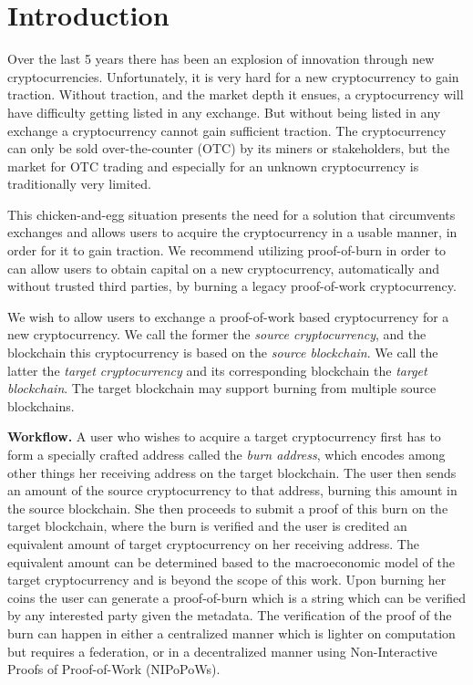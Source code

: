 \section{Introduction}\label{section:introduction}

Over the last 5 years there has been an explosion of innovation through new cryptocurrencies. Unfortunately, it is very hard for a new cryptocurrency to gain traction. Without traction, and the market depth it ensues, a cryptocurrency will have difficulty getting listed in any exchange. But without being listed in any exchange a cryptocurrency cannot gain sufficient traction. The cryptocurrency can only be sold over-the-counter (OTC) by its miners or stakeholders, but the market for OTC trading and especially for an unknown cryptocurrency is traditionally very limited.

This chicken-and-egg situation presents the need for a solution that circumvents exchanges and allows users to acquire the cryptocurrency in a usable manner, in order for it to gain traction. We recommend utilizing proof-of-burn in order to can allow users to obtain capital on a new cryptocurrency, automatically and without trusted third parties, by burning a legacy proof-of-work cryptocurrency.

We wish to allow users to exchange a proof-of-work based cryptocurrency for a new cryptocurrency. We call the former the \emph{source cryptocurrency}, and the blockchain this cryptocurrency is based on the \emph{source blockchain}. We call the latter the \emph{target cryptocurrency} and its corresponding blockchain the \emph{target blockchain}. The target blockchain may support burning from multiple source blockchains.

\noindent
\textbf{Workflow.}
A user who wishes to acquire a target cryptocurrency first has to form a specially crafted address called the \emph{burn address}, which encodes among other things her receiving address on the target blockchain. The user then sends an amount of the source cryptocurrency to that address, burning this amount in the source blockchain. She then proceeds to submit a proof of this burn on the target blockchain, where the burn is verified and the user is credited an equivalent amount of target cryptocurrency on her receiving address. The equivalent amount can be determined based to the macroeconomic model of the target cryptocurrency and is beyond the scope of this work. Upon burning her coins the user can generate a proof-of-burn which is a string which can be verified by any interested party given the metadata. The verification of the proof of the burn can happen in either a centralized manner which is lighter on computation but requires a federation, or in a decentralized manner using Non-Interactive Proofs of Proof-of-Work (NIPoPoWs).

